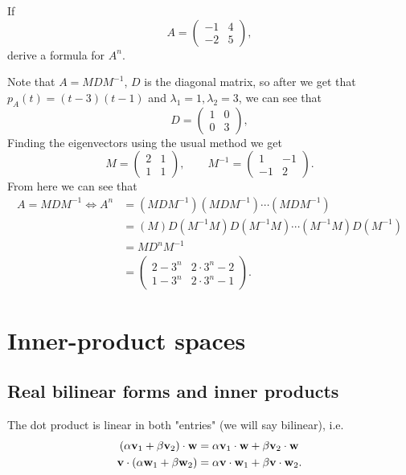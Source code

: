 \documentclass[10pt, a4paper]{article}
\begin{document}
\begin{example}
    If
    \[
    A = \begin{pmatrix}
        -1 & 4 \\ -2 & 5
    \end{pmatrix},
    \]
    derive a formula for $A ^ n$.
    \begin{solution}
        Note that $A = MDM ^ {-1}$,
        $D$ is the diagonal matrix,
        so after we get that $p_A(t) = (t - 3)(t - 1)$ and $\lambda_1 = 1, \lambda_2 = 3$,
        we can see that
        \[
        D = \begin{pmatrix}
            1 & 0 \\
            0 & 3
        \end{pmatrix},
        \]
        Finding the eigenvectors using the usual method we get
        \[
        M = \begin{pmatrix}
            2 & 1 \\
            1 & 1
        \end{pmatrix}, \qquad M ^ {-1} = \begin{pmatrix}
            1 & -1 \\
            -1 & 2
        \end{pmatrix}.
        \]
        From here we can see that
        \begin{align*}
            A = MDM ^ {-1} \iff A ^ n &= (MDM ^ {-1})(MDM ^ {-1}) \dotsi (MDM ^ {-1}) \\
            &= (M)D(M ^ {-1}M)D(M ^ {-1}M)\dotsi (M ^ {-1}M)D(M ^ {-1}) \\
            &= MD ^ {n}M ^ {-1} \\
            &= \begin{pmatrix}
                2 - 3 ^ n & 2 \cdot 3 ^ n - 2 \\
                1 - 3 ^ n & 2 \cdot 3 ^ n - 1
            \end{pmatrix}.
        \end{align*}
    \end{solution}
\end{example}

\newpage

\section{Inner-product spaces}

\subsection{Real bilinear forms and inner products}
The dot product is linear in both "entries"
(we will say bilinear),
i.e.
\begin{align*}
    (\alpha\mathbf{v}_1 + \beta\mathbf{v}_2) \cdot \mathbf{w} &= \alpha\mathbf{v}_1 \cdot \mathbf{w} + \beta\mathbf{v}_2 \cdot \mathbf{w} \\
    \mathbf{v} \cdot (\alpha\mathbf{w}_1 + \beta\mathbf{w}_2) &= \alpha\mathbf{v}\cdot\mathbf{w}_1 + \beta\mathbf{v}\cdot \mathbf{w}_2.
\end{align*}
\end{document}
